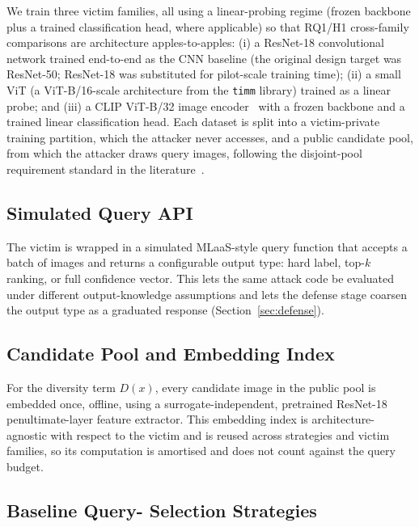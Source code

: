 \documentclass[journal,10pt]{IEEEtran}
\begin{document}
We train three victim families, all using a linear-probing regime (frozen backbone plus a trained
classification head, where applicable) so that RQ1/H1 cross-family comparisons are architecture
apples-to-apples: (i) a ResNet-18 convolutional network trained end-to-end as the CNN baseline
(the original design target was ResNet-50; ResNet-18 was substituted for pilot-scale training
time); (ii) a small ViT (a ViT-B/16-scale architecture from the \texttt{timm} library) trained as a
linear probe; and (iii) a CLIP ViT-B/32 image encoder~\cite{radford2021clip} with a frozen backbone
and a trained linear classification head. Each dataset is split into a victim-private training
partition, which the attacker never accesses, and a public candidate pool, from which the attacker
draws query images, following the disjoint-pool requirement standard in the
literature~\cite{orekondy2019knockoff-context}.

\subsection{Simulated Query API}

The victim is wrapped in a simulated MLaaS-style query function that accepts a batch of images and
returns a configurable output type: hard label, top-$k$ ranking, or full confidence vector.
This lets the same attack code be evaluated under different output-knowledge assumptions and lets
the defense stage coarsen the output type as a graduated response (Section~\ref{sec:defense}).

\subsection{Candidate Pool and Embedding Index}

For the diversity term $D(x)$, every candidate image in the public pool is embedded once, offline,
using a surrogate-independent, pretrained ResNet-18 penultimate-layer feature extractor. This
embedding index is architecture-agnostic with respect to the victim and is reused across strategies
and victim families, so its computation is amortised and does not count against the query budget.

\subsection{Baseline Query- Selection Strategies}
\end{document}
